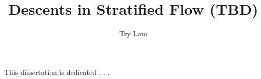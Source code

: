 \documentclass{report}
\begin{document}

\title{Descents in Stratified Flow (TBD)}

\author{Try Lam}




\begin{preface}

    This dissertation is dedicated . . .

    

  \tableofcontents
  \listoftables
  \listoffigures

    
\end{preface}








\begin{singlespace}

  \appendix
  
\end{singlespace}

\end{document}
